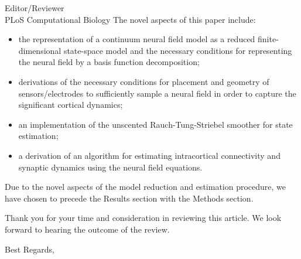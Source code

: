 \documentclass[a4paper,10pt]{letter}
\begin{document}
\begin{letter}{Editor/Reviewer \\ PLoS Computational Biology}
The novel aspects of this paper include:
\begin{itemize}
	\item the representation of a continuum neural field model as a reduced finite-dimensional state-space model and the necessary conditions for representing the neural field by a basis function decomposition;
	\item derivations of the necessary conditions for placement and geometry of sensors/electrodes to sufficiently sample a neural field in order to capture the significant cortical dynamics;
	\item an implementation of the unscented Rauch-Tung-Striebel smoother for state estimation;
	\item a derivation of an algorithm for estimating intracortical connectivity and synaptic dynamics using the neural field equations.
\end{itemize}

Due to the novel aspects of the model reduction and estimation procedure, we have chosen to precede the Results section with the Methods section.

Thank you for your time and consideration in reviewing this article. We look forward to hearing the outcome of the review.

\closing{Best Regards,}

% 
\end{letter}
\end{document}

